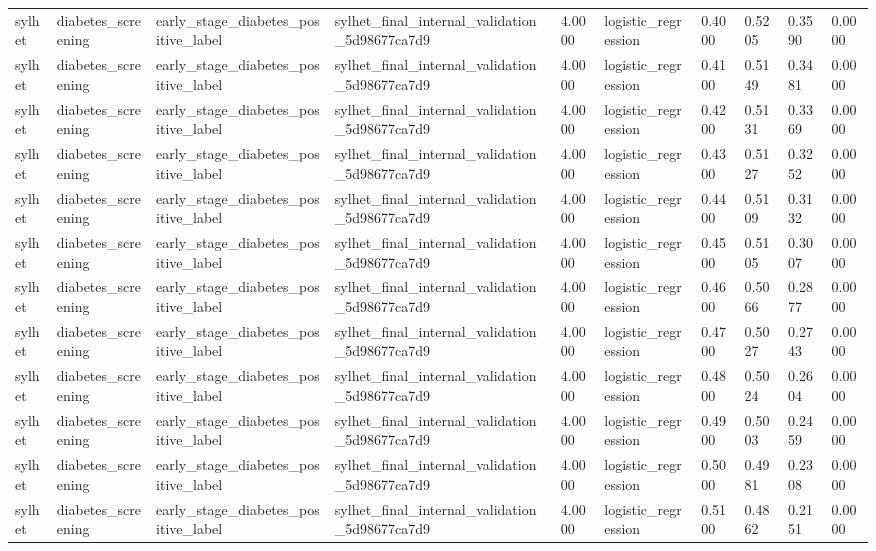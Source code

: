 \begin{tabular}{llllllllll}
sylhet & diabetes\_screening & early\_stage\_diabetes\_positive\_label & sylhet\_final\_internal\_validation\_5d98677ca7d9 & 4.0000 & logistic\_regression & 0.4000 & 0.5205 & 0.3590 & 0.0000 \\
sylhet & diabetes\_screening & early\_stage\_diabetes\_positive\_label & sylhet\_final\_internal\_validation\_5d98677ca7d9 & 4.0000 & logistic\_regression & 0.4100 & 0.5149 & 0.3481 & 0.0000 \\
sylhet & diabetes\_screening & early\_stage\_diabetes\_positive\_label & sylhet\_final\_internal\_validation\_5d98677ca7d9 & 4.0000 & logistic\_regression & 0.4200 & 0.5131 & 0.3369 & 0.0000 \\
sylhet & diabetes\_screening & early\_stage\_diabetes\_positive\_label & sylhet\_final\_internal\_validation\_5d98677ca7d9 & 4.0000 & logistic\_regression & 0.4300 & 0.5127 & 0.3252 & 0.0000 \\
sylhet & diabetes\_screening & early\_stage\_diabetes\_positive\_label & sylhet\_final\_internal\_validation\_5d98677ca7d9 & 4.0000 & logistic\_regression & 0.4400 & 0.5109 & 0.3132 & 0.0000 \\
sylhet & diabetes\_screening & early\_stage\_diabetes\_positive\_label & sylhet\_final\_internal\_validation\_5d98677ca7d9 & 4.0000 & logistic\_regression & 0.4500 & 0.5105 & 0.3007 & 0.0000 \\
sylhet & diabetes\_screening & early\_stage\_diabetes\_positive\_label & sylhet\_final\_internal\_validation\_5d98677ca7d9 & 4.0000 & logistic\_regression & 0.4600 & 0.5066 & 0.2877 & 0.0000 \\
sylhet & diabetes\_screening & early\_stage\_diabetes\_positive\_label & sylhet\_final\_internal\_validation\_5d98677ca7d9 & 4.0000 & logistic\_regression & 0.4700 & 0.5027 & 0.2743 & 0.0000 \\
sylhet & diabetes\_screening & early\_stage\_diabetes\_positive\_label & sylhet\_final\_internal\_validation\_5d98677ca7d9 & 4.0000 & logistic\_regression & 0.4800 & 0.5024 & 0.2604 & 0.0000 \\
sylhet & diabetes\_screening & early\_stage\_diabetes\_positive\_label & sylhet\_final\_internal\_validation\_5d98677ca7d9 & 4.0000 & logistic\_regression & 0.4900 & 0.5003 & 0.2459 & 0.0000 \\
sylhet & diabetes\_screening & early\_stage\_diabetes\_positive\_label & sylhet\_final\_internal\_validation\_5d98677ca7d9 & 4.0000 & logistic\_regression & 0.5000 & 0.4981 & 0.2308 & 0.0000 \\
sylhet & diabetes\_screening & early\_stage\_diabetes\_positive\_label & sylhet\_final\_internal\_validation\_5d98677ca7d9 & 4.0000 & logistic\_regression & 0.5100 & 0.4862 & 0.2151 & 0.0000 \\

\end{tabular}
